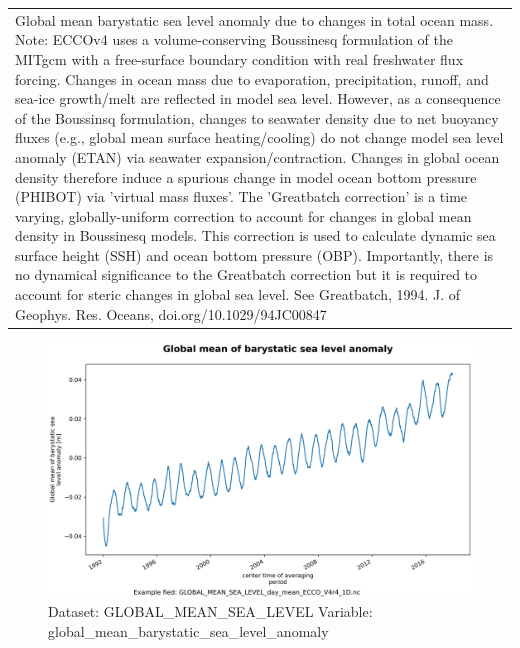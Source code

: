 \begin{longtable}{|m{}|m{}|m{}|m{}|}
\rowcolor{lightgray} \multicolumn{4}{|p{1.00\textwidth}|}{\textbf{Comments}} \\ \hline
\multicolumn{4}{|p{1\textwidth}|}{Global mean barystatic sea level anomaly due to changes in total ocean mass. Note: ECCOv4 uses a volume-conserving Boussinesq formulation of the MITgcm with a free-surface boundary condition with real freshwater flux forcing. Changes in ocean mass due to evaporation, precipitation, runoff, and sea-ice growth/melt are reflected in model sea level. However, as a consequence of the Boussinsq formulation, changes to seawater density due to net buoyancy fluxes (e.g., global mean surface heating/cooling) do not change model sea level anomaly (ETAN) via seawater expansion/contraction. Changes in global ocean density therefore induce a spurious change in model ocean bottom pressure (PHIBOT) via 'virtual mass fluxes'. The 'Greatbatch correction' is a time varying, globally-uniform correction to account for changes in global mean density in Boussinesq models. This correction is used to calculate dynamic sea surface height (SSH) and ocean bottom pressure (OBP). Importantly, there is no dynamical significance to the Greatbatch correction but it is required to account for steric changes in global sea level. See Greatbatch, 1994. J. of Geophys. Res. Oceans, doi.org/10.1029/94JC00847} \\ \hline
\end{longtable}

\begin{figure}[H]
\centering
\includegraphics[scale=0.55]{../images/plots/oneD_plots/Global_Mean_Sea_Level/global_mean_barystatic_sea_level_anomaly.png}
\caption{Dataset: GLOBAL\_MEAN\_SEA\_LEVEL Variable: global\_mean\_barystatic\_sea\_level\_anomaly}
\label{tab:table-GLOBAL_MEAN_SEA_LEVEL_global_mean_barystatic_sea_level_anomaly-Plot}
\end{figure}
\pagebreak

